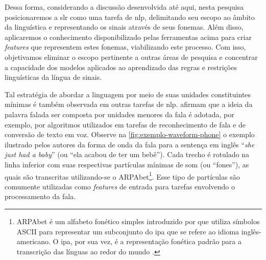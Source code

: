 Dessa forma, considerando a discussão desenvolvida até aqui, nesta pesquisa posicionaremos a \acrshort{slr} como uma tarefa de \acrshort{nlp}, delimitando seu escopo ao âmbito da linguística e representando os sinais através de seus fonemas. Além disso, aplicaremos o conhecimento disponibilizado pelas ferramentas acima para criar \textit{features} que representem estes fonemas, viabilizando este processo.
Com isso, objetivamos eliminar o escopo pertinente a outras áreas de pesquisa e concentrar a capacidade dos modelos aplicados ao aprendizado das regras e restrições linguísticas da língua de sinais.

Tal estratégia de abordar a linguagem por meio de suas unidades constituintes mínimas é também observada em outras tarefas de \acrshort{nlp}.  afirmam que a ideia da palavra falada ser composta por unidades menores da fala é adotada, por exemplo, por algoritmos utilizados em tarefas de reconhecimento de fala e de conversão de texto em voz.
Observe na \autoref{fig:exemplo-waveform-phone} o exemplo ilustrado pelos autores da forma de onda da fala para a sentença em inglês ``\textit{she just had a baby}'' (ou ``ela acabou de ter um bebê'').
Cada trecho é rotulado na linha inferior com suas respectivas partículas mínimas de som (ou ``fones''), as quais são transcritas utilizando-se o ARPAbet\footnote{
    ARPAbet é um alfabeto fonético simples introduzido por  que utiliza símbolos ASCII para representar um subconjunto do \acrshort{ipa} que se refere ao idioma inglês-americano. O \acrfull{ipa}, por sua vez, é a representação fonética padrão para a transcrição das línguas ao redor do mundo \cite{jurafsky-2022-speech-lang-processing}.
}. Esse tipo de partículas são comumente utilizadas como \textit{features} de entrada para tarefas envolvendo o processamento da fala.



